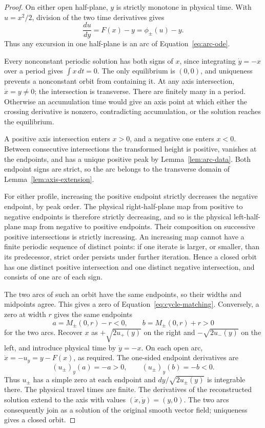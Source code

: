 \begin{proof}
On either open half-plane, \(y\) is strictly monotone in physical
time. With \(u=x^2/2\), division of the two time derivatives gives
\[
  \frac{du}{dy}=F(x)-y=\phi_\pm(u)-y.
\]
Thus any excursion in one half-plane is an arc of
Equation~\eqref{eq:arc-ode}.

Every nonconstant periodic solution has both signs of \(x\), since
integrating \(\dot y=-x\) over a period gives \(\int x\,dt=0\).
The only equilibrium is \((0,0)\), and uniqueness prevents a
nonconstant orbit from containing it. At any axis intersection,
\(\dot x=y\ne0\); the intersection is transverse. There are finitely
many in a period. Otherwise an accumulation time would give an
axis point at which either the crossing derivative is nonzero,
contradicting accumulation, or the solution reaches the equilibrium.

A positive axis intersection enters \(x>0\), and a negative one
enters \(x<0\). Between consecutive intersections the transformed
height is positive, vanishes at the endpoints, and has a unique
positive peak by Lemma~\ref{lem:arc-data}. Both endpoint signs are
strict, so the arc belongs to the transverse domain of
Lemma~\ref{lem:axis-extension}.

For either profile, increasing the positive endpoint strictly
decreases the negative endpoint, by peak order. The physical
right-half-plane map from positive to negative endpoints is
therefore strictly decreasing, and so is the physical left-half-plane
map from negative to positive endpoints. Their composition on
successive positive intersections is strictly increasing.
An increasing map cannot have a finite periodic sequence of
distinct points: if one iterate is larger, or smaller, than its
predecessor, strict order persists under further iteration.
Hence a closed orbit has one distinct positive intersection and
one distinct negative intersection, and consists of one arc of
each sign.

The two arcs of such an orbit have the same endpoints, so their
widths and midpoints agree. This gives a zero of
Equation~\eqref{eq:cycle-matching}. Conversely, a zero at width \(r\)
gives the same endpoints
\[
  a=M_\pm(0,r)-r<0,\qquad
  b=M_\pm(0,r)+r>0
\]
for the two arcs. Recover \(x\) as \(+\sqrt{2u_+(y)}\) on the right
and \(-\sqrt{2u_-(y)}\) on the left, and introduce physical time by
\(\dot y=-x\). On each open arc,
\(\dot x=-u_y=y-F(x)\), as required. The one-sided endpoint derivatives
are
\[
  (u_\pm)_y(a)=-a>0,\qquad (u_\pm)_y(b)=-b<0.
\]
Thus \(u_\pm\) has a simple zero at each endpoint and
\(dy/\sqrt{2u_\pm(y)}\) is integrable there. The physical travel
times are finite. The derivatives of the reconstructed solution
extend to the axis with values \((\dot x,\dot y)=(y,0)\).
The two arcs consequently join as a solution of the original smooth
vector field; uniqueness gives a closed orbit.


\end{proof}
